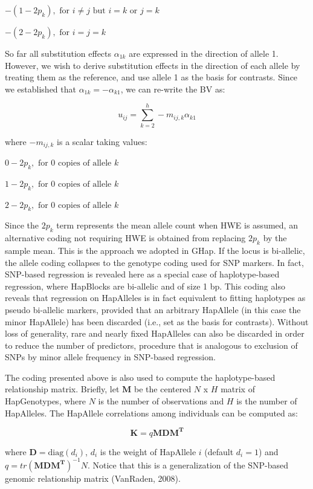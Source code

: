 \documentclass[
]{article}
\begin{document}
\(-(1-2p_k), \text{ for } i \neq j \text{ but } i = k \text{ or } j = k\)

\(-(2-2p_k), \text{ for } i = j = k\)

So far all substitution effects \(\alpha_{1k}\) are expressed in the
direction of allele 1. However, we wish to derive substitution effects
in the direction of each allele by treating them as the reference, and
use allele 1 as the basis for contrasts. Since we established that
\(\alpha_{1k} = - \alpha_{k1}\), we can re-write the BV as:

\[u_{ij} = \sum_{k = 2}^{h} -m_{ij,k}\alpha_{k1}\]

where \(-m_{ij,k}\) is a scalar taking values:

\(0-2p_k, \text{ for 0 copies of allele } k\)

\(1-2p_k, \text{ for 0 copies of allele } k\)

\(2-2p_k, \text{ for 0 copies of allele } k\)

Since the \(2p_k\) term represents the mean allele count when HWE is
assumed, an alternative coding not requiring HWE is obtained from
replacing \(2p_k\) by the sample mean. This is the approach we adopted
in GHap. If the locus is bi-allelic, the allele coding collapses to the
genotype coding used for SNP markers. In fact, SNP-based regression is
revealed here as a special case of haplotype-based regression, where
HapBlocks are bi-allelic and of size 1 bp. This coding also reveals that
regression on HapAlleles is in fact equivalent to fitting haplotypes as
pseudo bi-allelic markers, provided that an arbitrary HapAllele (in this
case the minor HapAllele) has been discarded (i.e., set as the basis for
contrasts). Without loss of generality, rare and nearly fixed HapAlleles
can also be discarded in order to reduce the number of predictors,
procedure that is analogous to exclusion of SNPs by minor allele
frequency in SNP-based regression.

The coding presented above is also used to compute the haplotype-based
relationship matrix. Briefly, let \(\mathbf{M}\) be the centered \(N\) x
\(H\) matrix of HapGenotypes, where \(N\) is the number of observations
and \(H\) is the number of HapAlleles. The HapAllele correlations among
individuals can be computed as:

\[\mathbf{K} = q\mathbf{MDM^\text{T}}\]

where \(\mathbf{D} = \text{diag}(d_i)\), \(d_i\) is the weight of
HapAllele \(i\) (default \(d_i = 1\)) and
\(q = tr(\mathbf{MDM^\text{T}})^{-1}N\). Notice that this is a
generalization of the SNP-based genomic relationship matrix (VanRaden,
2008).
\end{document}
